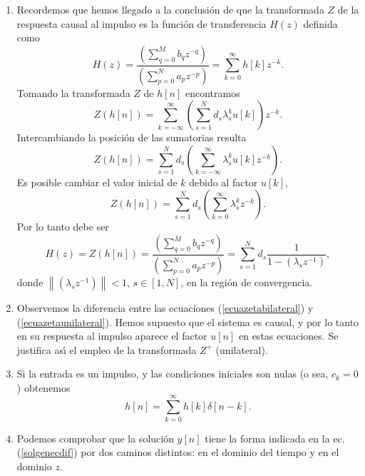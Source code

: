 \begin{enumerate}
\item Recordemos que hemos llegado a la conclusi\'{o}n de que la transformada $Z$ de la respuesta causal 
al impulso es la funci\'{o}n de transferencia $H(z)$ definida como
\begin{equation}
  H\left( z\right) =
  \frac{\left( \sum_{q=0}^{M}b_{q}z^{-q}\right) }{\left(\sum_{p=0}^{N}a_{p}z^{-p}\right) } = 
  \sum_{k=0 }^{\infty }h\left[ k\right]z^{-k}.
\end{equation}
Tomando la transformada $Z$ de $h[n]$ encontramos
\begin{equation}
  Z(h[n]) = \sum_{k=-\infty}^{\infty} \left(\sum_{s=1}^{N} d_{s} \lambda_{s}^{k} u[k] \right) z^{-k}.
\end{equation}
Intercambiando la posici\'{o}n de las sumatorias resulta
\begin{equation} \label{ecuazetabilateral}
  Z(h[n]) = \sum_{s=1}^{N} d_{s} \left( \sum_{k=-\infty}^{\infty} \lambda_{s}^{k} u[k] z^{-k} \right).
\end{equation}
Es posible cambiar el valor inicial de $k$ debido al factor $u[k]$,
\begin{equation} \label{ecuazetaunilateral}
  Z(h[n]) = \sum_{s=1}^{N} d_{s} \left( \sum_{k=0}^{\infty} \lambda_{s}^{k} z^{-k} \right).
\end{equation}
Por lo tanto debe ser
\begin{equation}
  H\left( z\right) = Z(h[n]) =
  \frac{\left( \sum_{q=0}^{M}b_{q}z^{-q}\right) }{\left(\sum_{p=0}^{N}a_{p}z^{-p}\right) } = 
  \sum_{s=1}^{N} d_{s} \frac{1}{1 - (\lambda_{s} z^{-1})},
\end{equation}
donde $\left \|(\lambda_{s} z^{-1}) \right\| < 1$, $s \in [1,N]$, en la regi\'{o}n de convergencia.

\item Observemos la diferencia entre las ecuaciones 
  (\ref{ecuazetabilateral}) y (\ref{ecuazetaunilateral}). Hemos supuesto que el sistema es causal, y 
por lo tanto en su respuesta al impulso aparece el factor $u[n]$ en estas ecuaciones. 
Se justifica as\'{\i} el empleo de la transformada $Z^{+}$ (unilateral).

\item Si la entrada es un impulso, y las condiciones iniciales son nulas (o sea, 
$c_{k} = 0$) obtenemos
\begin{equation}
   h[n] = \sum_{k=0}^{\infty} h[k] \delta[n-k].
\end{equation}

\item Podemos comprobar que la soluci\'{o}n $y[n]$ tiene la forma indicada en la ec. (\ref{solgenecdif}) 
por dos caminos distintos: en el dominio del tiempo y en el dominio $z$. 


\end{enumerate}
